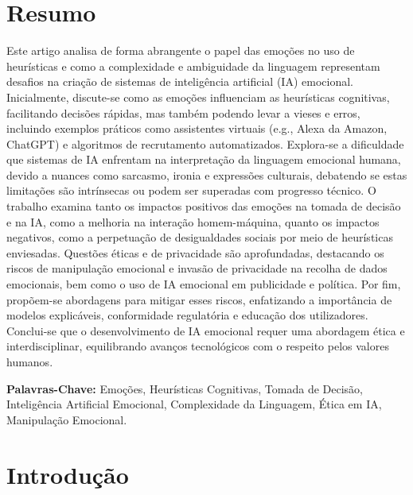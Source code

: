 \documentclass[a4paper,12pt]{report}
\begin{document}
	
	\newpage
	\thispagestyle{empty}
	\mbox{}
	\newpage
	
	
	\section*{Resumo} 
	
	Este artigo analisa de forma abrangente o papel das emoções no uso de heurísticas e como a complexidade e ambiguidade da linguagem representam desafios na criação de sistemas de inteligência artificial (IA) emocional. Inicialmente, discute-se como as emoções influenciam as heurísticas cognitivas, facilitando decisões rápidas, mas também podendo levar a vieses e erros, incluindo exemplos práticos como assistentes virtuais (e.g., Alexa da Amazon, ChatGPT) e algoritmos de recrutamento automatizados. Explora-se a dificuldade que sistemas de IA enfrentam na interpretação da linguagem emocional humana, devido a nuances como sarcasmo, ironia e expressões culturais, debatendo se estas limitações são intrínsecas ou podem ser superadas com progresso técnico. O trabalho examina tanto os impactos positivos das emoções na tomada de decisão e na IA, como a melhoria na interação homem-máquina, quanto os impactos negativos, como a perpetuação de desigualdades sociais por meio de heurísticas enviesadas. Questões éticas e de privacidade são aprofundadas, destacando os riscos de manipulação emocional e invasão de privacidade na recolha de dados emocionais, bem como o uso de IA emocional em publicidade e política. Por fim, propõem-se abordagens para mitigar esses riscos, enfatizando a importância de modelos explicáveis, conformidade regulatória e educação dos utilizadores. Conclui-se que o desenvolvimento de IA emocional requer uma abordagem ética e interdisciplinar, equilibrando avanços tecnológicos com o respeito pelos valores humanos.
	
	\vspace{4em}
	
	\noindent\textbf{Palavras-Chave:} \normalsize{Emoções, Heurísticas Cognitivas, Tomada de Decisão, Inteligência Artificial Emocional, Complexidade da Linguagem, Ética em IA, Manipulação Emocional.}
	
	\newpage	
	
	
	\section{Introdução}
	
\end{document}
